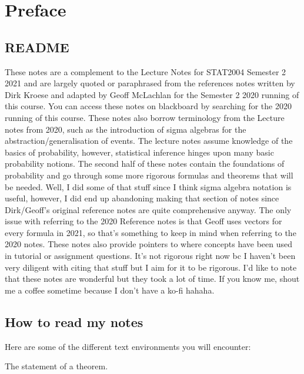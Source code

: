 \chapter*{Preface}

\section*{README}

These notes are a complement to the Lecture Notes for STAT2004 
Semester 2 2021 and are largely quoted or paraphrased from 
the references notes written by Dirk Kroese and adapted by Geoff McLachlan 
for the Semester 2 2020 running of this course. 
You can access these notes on blackboard by searching for the 2020 running of this course. 
These notes also borrow terminology from the Lecture notes from 2020, such as the introduction of 
sigma algebras for the abstraction/generalisation of events.
\bigskip
The lecture notes assume knowledge of the basics of probability, 
however, statistical inference hinges upon many basic 
probability notions. The second half of these notes contain the foundations 
of probability and go through some more rigorous formulas 
and theorems that will be needed. 
Well, I did some of that stuff since I think sigma algebra notation is useful, however, 
I did end up abandoning making that section of notes 
since Dirk/Geoff's original reference notes are quite comprehensive anyway. 
The only issue with referring to the 2020 Reference notes is that Geoff uses vectors for every formula in 2021, so that's something to keep in mind when referring to the 2020 notes. 
\bigskip
These notes also provide pointers to where concepts have been used in tutorial or assignment questions. 
It's not rigorous right now bc I haven't been very diligent with citing that stuff but I aim for it to be rigorous. 
\bigskip
I'd like to note that these notes are wonderful but they 
took a lot of time. 
If you know me, shout me a coffee sometime because I don't have a ko-fi hahaha. 

\section*{How to read my notes}

Here are some of the different text environments you will encounter:
\begin{theorem}
    The statement of a theorem. 
\end{theorem}

